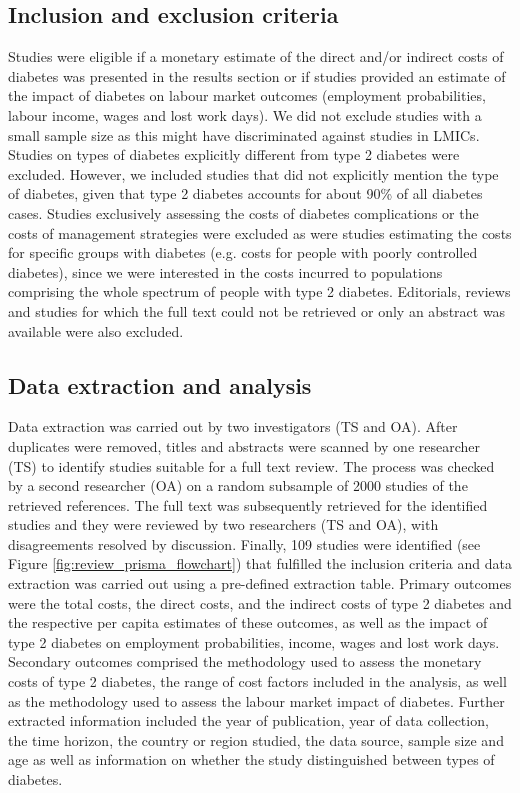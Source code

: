 \subsection{Inclusion and exclusion criteria}
Studies were eligible if a monetary estimate of the direct and/or indirect costs of diabetes was presented in the results section or if studies provided an estimate of the impact of diabetes on labour market outcomes (employment probabilities, labour income, wages and lost work days). We did not exclude studies with a small sample size as this might have discriminated against studies in \acp{LMIC}. Studies on types of diabetes explicitly different from type 2 diabetes were excluded. However, we included studies that did not explicitly mention the type of diabetes, given that type 2 diabetes accounts for about 90\% of all diabetes cases. Studies exclusively assessing the costs of diabetes complications or the costs of management strategies were excluded as were studies estimating the costs for specific groups with diabetes (e.g. costs for people with poorly controlled diabetes), since we were interested in the costs incurred to populations comprising the whole spectrum of people with type 2 diabetes. Editorials, reviews and studies for which the full text could not be retrieved or only an abstract was available were also excluded.

\subsection{Data extraction and analysis}
Data extraction was carried out by two investigators (TS and OA). After duplicates were removed, titles and abstracts were scanned by one researcher (TS) to identify studies suitable for a full text review. The process was checked by a second researcher (OA) on a random subsample of 2000 studies of the retrieved references. The full text was subsequently retrieved for the identified studies and they were reviewed by two researchers (TS and OA), with disagreements resolved by discussion. Finally, 109 studies were identified (see Figure \ref{fig:review_prisma_flowchart}) that fulfilled the inclusion criteria and data extraction was carried out using a pre-defined extraction table. Primary outcomes were the total costs, the direct costs, and the indirect costs of type 2 diabetes and the respective per capita estimates of these outcomes, as well as the impact of type 2 diabetes on employment probabilities, income, wages and lost work days. Secondary outcomes comprised the methodology used to assess the monetary costs of type 2 diabetes, the range of cost factors included in the analysis, as well as the methodology used to assess the labour market impact of diabetes. Further extracted information included the year of publication, year of data collection, the time horizon, the country or region studied, the data source, sample size and age as well as information on whether the study distinguished between types of diabetes.


